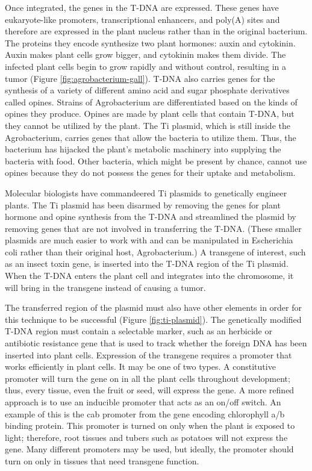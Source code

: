 \documentclass[nofonts,]{tufte-handout}
\begin{document}
Once integrated, the genes in the T-DNA are expressed. These genes have
eukaryote-like promoters, transcriptional enhancers, and poly(A) sites
and therefore are expressed in the plant nucleus rather than in the
original bacterium. The proteins they encode synthesize two plant
hormones: auxin and cytokinin. Auxin makes plant cells grow bigger, and
cytokinin makes them divide. The infected plant cells begin to grow
rapidly and without control, resulting in a tumor (Figure
\ref{fig:agrobacterium-gall}). T-DNA also carries genes for the
synthesis of a variety of different amino acid and sugar phosphate
derivatives called opines. Strains of Agrobacterium are differentiated
based on the kinds of opines they produce. Opines are made by plant
cells that contain T-DNA, but they cannot be utilized by the plant. The
Ti plasmid, which is still inside the Agrobacterium, carries genes that
allow the bacteria to utilize them. Thus, the bacterium has hijacked the
plant's metabolic machinery into supplying the bacteria with food. Other
bacteria, which might be present by chance, cannot use opines because
they do not possess the genes for their uptake and metabolism.

Molecular biologists have commandeered Ti plasmids to genetically
engineer plants. The Ti plasmid has been disarmed by removing the genes
for plant hormone and opine synthesis from the T-DNA and streamlined the
plasmid by removing genes that are not involved in transferring the
T-DNA. (These smaller plasmids are much easier to work with and can be
manipulated in Escherichia coli rather than their original host,
Agrobacterium.) A transgene of interest, such as an insect toxin gene,
is inserted into the T-DNA region of the Ti plasmid. When the T-DNA
enters the plant cell and integrates into the chromosome, it will bring
in the transgene instead of causing a tumor.

The transferred region of the plasmid must also have other elements in
order for this technique to be successful (Figure \ref{fig:ti-plasmid}).
The genetically modified T-DNA region must contain a selectable marker,
such as an herbicide or antibiotic resistance gene that is used to track
whether the foreign DNA has been inserted into plant cells. Expression
of the transgene requires a promoter that works efficiently in plant
cells. It may be one of two types. A constitutive promoter will turn the
gene on in all the plant cells throughout development; thus, every
tissue, even the fruit or seed, will express the gene. A more refined
approach is to use an inducible promoter that acts as an on/off switch.
An example of this is the cab promoter from the gene encoding
chlorophyll a/b binding protein. This promoter is turned on only when
the plant is exposed to light; therefore, root tissues and tubers such
as potatoes will not express the gene. Many different promoters may be
used, but ideally, the promoter should turn on only in tissues that need
transgene function.
\end{document}
